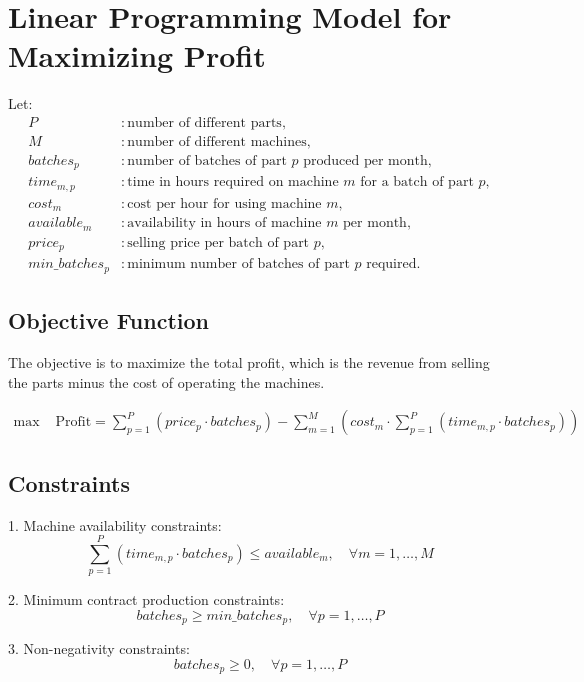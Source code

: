 \documentclass{article}
\begin{document}
\section*{Linear Programming Model for Maximizing Profit}

Let:
\begin{align*}
P & : \text{number of different parts}, \\
M & : \text{number of different machines}, \\
batches_p & : \text{number of batches of part } p \text{ produced per month}, \\
time_{m,p} & : \text{time in hours required on machine } m \text{ for a batch of part } p, \\
cost_m & : \text{cost per hour for using machine } m, \\
available_m & : \text{availability in hours of machine } m \text{ per month}, \\
price_p & : \text{selling price per batch of part } p, \\
min\_batches_p & : \text{minimum number of batches of part } p \text{ required}.
\end{align*}

\subsection*{Objective Function}
The objective is to maximize the total profit, which is the revenue from selling the parts minus the cost of operating the machines.

\begin{align*}
\text{max } & \text{Profit} = \sum_{p=1}^{P} \left( price_p \cdot batches_p \right) - \sum_{m=1}^{M} \left( cost_m \cdot \sum_{p=1}^{P} \left( time_{m,p} \cdot batches_p \right) \right)
\end{align*}

\subsection*{Constraints}
1. Machine availability constraints:
\[
\sum_{p=1}^{P} \left( time_{m,p} \cdot batches_p \right) \leq available_m, \quad \forall m = 1, \ldots, M
\]

2. Minimum contract production constraints:
\[
batches_p \geq min\_batches_p, \quad \forall p = 1, \ldots, P
\]

3. Non-negativity constraints:
\[
batches_p \geq 0, \quad \forall p = 1, \ldots, P
\]
\end{document}
